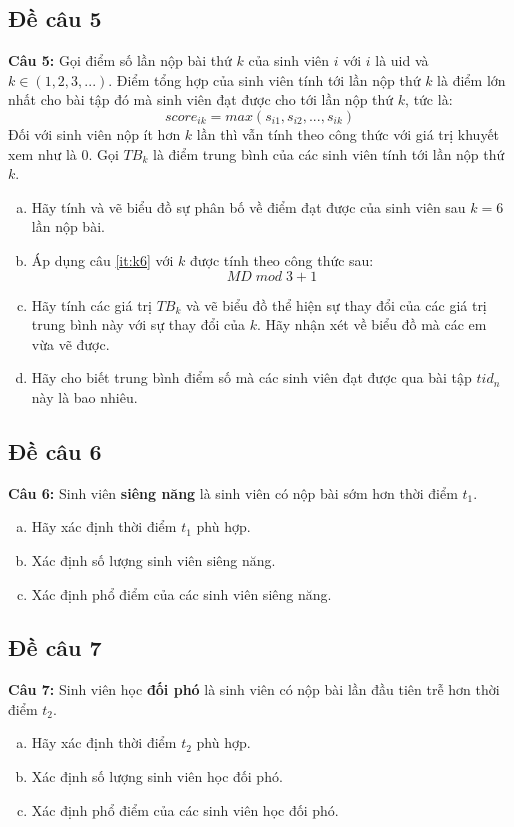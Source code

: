 \documentclass[a4paper]{article}
\theoremstyle{definition}
\begin{document}
\begin{itemize}
\subsection{Đề câu 5}
\item[] {\textbf{Câu 5: } Gọi điểm số lần nộp bài thứ $k$ của sinh viên $i$ với $i$ là uid và $k \in (1, 2, 3, ...)$. Điểm tổng hợp của sinh viên tính tới lần nộp thứ $k$ là điểm lớn nhất cho bài tập đó mà sinh viên đạt được cho tới lần nộp thứ $k$, tức là:
    $$score_{ik} = max(s_{i1}, s_{i2}, ..., s_{ik})$$
    Đối với sinh viên nộp ít hơn $k$ lần thì vẫn tính theo công thức với giá trị khuyết xem như là 0. Gọi $TB_k$ là điểm trung bình của các sinh viên tính tới lần nộp thứ $k$.}
    
      \begin{enumerate}[a)]
      \item \label{it:k6} Hãy tính và vẽ biểu đồ sự phân bố về điểm đạt được của sinh viên sau $k=6$ lần nộp bài.
      \item Áp dụng câu \ref{it:k6} với $k$ được tính theo công thức sau: $$MD \; mod \; 3 + 1  $$
      \item Hãy tính các giá trị $TB_k$ và vẽ biểu đồ thể hiện sự thay đổi của các giá trị trung bình này với sự thay đổi của $k$. Hãy nhận xét về biểu đồ mà các em vừa vẽ được.
      \item Hãy cho biết trung bình điểm số mà các sinh viên đạt được qua bài tập $tid_n$ này là bao nhiêu.
    \end{enumerate}
    
\subsection{Đề câu 6}    
\item[] {\textbf{Câu 6: } {Sinh viên \textbf{siêng năng} là sinh viên có nộp bài sớm hơn thời điểm $t_1$.}
\begin{enumerate}[a)]
    \item {Hãy xác định thời điểm $t_1$ phù hợp.} 
    \item {Xác định số lượng sinh viên siêng năng.}
    \item {Xác định phổ điểm của các sinh viên siêng năng.}
\end{enumerate}
    
\subsection{Đề câu 7}    
\item[] {\textbf{Câu 7: } Sinh viên học \textbf{đối phó} là sinh viên có nộp bài lần đầu tiên trễ hơn thời điểm $t_2$.} 
\begin{enumerate}[a)]
    \item {Hãy xác định thời điểm $t_2$ phù hợp.}
    \item {Xác định số lượng sinh viên học đối phó.}
    \item {Xác định phổ điểm của các sinh viên học đối phó.}
\end{enumerate}
    
}
\end{itemize}
\end{document}
